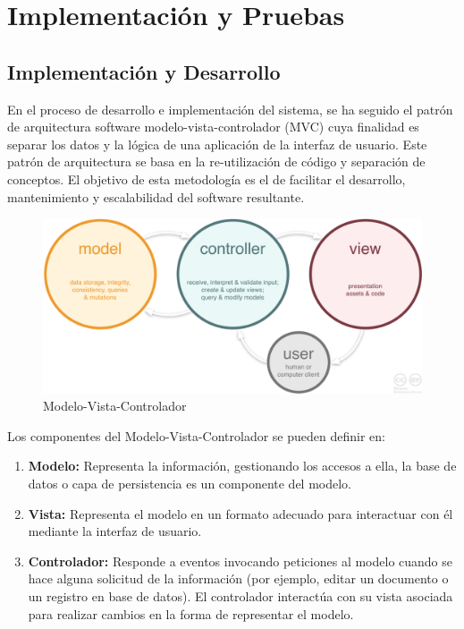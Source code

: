 \documentclass[a4paper,11pt]{book}
\begin{document}
\chapter{ Implementación y Pruebas}


\section{Implementación y Desarrollo}\label{secid}

En el proceso de desarrollo e implementación del sistema, se ha seguido el patrón de arquitectura software modelo-vista-controlador (MVC)\cite{mvc} cuya finalidad es separar los datos y la lógica de una aplicación de la interfaz de usuario. Este patrón de arquitectura se basa en la re-utilización de código y separación de conceptos. El objetivo de esta metodología es el de facilitar el desarrollo, mantenimiento y escalabilidad del software resultante.

\begin{figure}[H]
\centering
\includegraphics[scale=0.20]{imagenes/mvc.png}
\caption{ Modelo-Vista-Controlador\cite{mvc2}  }
\end{figure}

Los componentes\cite{mvc3} del Modelo-Vista-Controlador se pueden definir en:

\begin{enumerate}
\item \textbf{Modelo:} Representa la información, gestionando los accesos a ella, la base de datos  o capa de persistencia es un componente del modelo.

\item \textbf{Vista:} Representa el modelo en un formato adecuado para interactuar con él mediante la interfaz de usuario.

\item \textbf{Controlador:} Responde a eventos invocando peticiones al modelo cuando se hace alguna solicitud de la información (por ejemplo, editar un documento o un registro en base de datos). El controlador interactúa con su vista asociada para realizar cambios en la forma de representar el modelo.
\end{enumerate}
\end{document}
